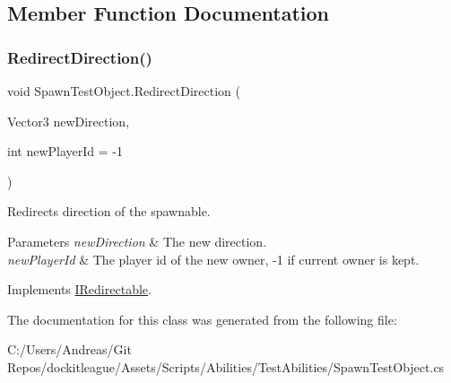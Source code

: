 \subsection{Member Function Documentation}
\hypertarget{class_spawn_test_object_a30ea3b6eb99e3803d605ec659c5270ce}{}\label{class_spawn_test_object_a30ea3b6eb99e3803d605ec659c5270ce} 
\subsubsection{\texorpdfstring{Redirect\+Direction()}{RedirectDirection()}}
{\footnotesize\ttfamily void Spawn\+Test\+Object.\+Redirect\+Direction (\begin{DoxyParamCaption}\item[{Vector3}]{new\+Direction,  }\item[{int}]{new\+Player\+Id = {\ttfamily -\/1} }\end{DoxyParamCaption})}



Redirects direction of the spawnable. 


\begin{DoxyParams}{Parameters}
{\em new\+Direction} & The new direction.\\
\hline
{\em new\+Player\+Id} & The player id of the new owner, -\/1 if current owner is kept.\\
\hline
\end{DoxyParams}


Implements \hyperlink{interface_i_redirectable_aa15f51457871f82028b3789ff0b0e33c}{I\+Redirectable}.



The documentation for this class was generated from the following file\+:\begin{DoxyCompactItemize}
\item 
C\+:/\+Users/\+Andreas/\+Git Repos/dockitleague/\+Assets/\+Scripts/\+Abilities/\+Test\+Abilities/Spawn\+Test\+Object.\+cs\end{DoxyCompactItemize}
